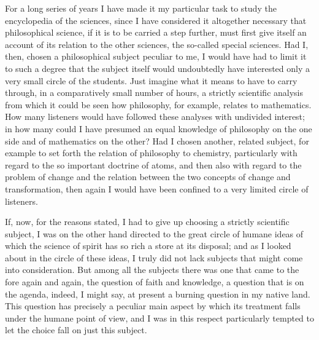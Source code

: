 \documentclass[12pt]{book}
\newcommand{\opage}[1]{\marginnote{\footnotesize\textit{[#1]}}}
\begin{document}
For a long series of years I have made it my particular task to study the
encyclopedia of the sciences, since I have considered it altogether
necessary that philosophical science, if it is to be carried a step
further, must first give itself an account of its relation to the other
sciences, the so-called special sciences. Had I, then, chosen a
philosophical subject peculiar to me, I would have had to limit it to
such a degree that the subject itself would undoubtedly have
\opage{281}\setcounter{footnote}{0}%
interested only a very small circle of the students. Just imagine what it
means to have to carry through, in a comparatively small number of hours,
a strictly scientific analysis from which it could be seen how philosophy,
for example, relates to mathematics. How many listeners would have
followed these analyses with undivided interest; in how many could I have
presumed an equal knowledge of philosophy on the one side and of
mathematics on the other? Had I chosen another, related subject, for
example to set forth the relation of philosophy to chemistry, particularly
with regard to the so important doctrine of atoms, and then also with
regard to the problem of change and the relation between the two concepts
of change and transformation, then again I would have been confined to a
very limited circle of listeners.

If, now, for the reasons stated, I had to give up choosing a strictly
scientific subject, I was on the other hand directed to the great circle
of humane ideas of which the science of spirit has so rich a store at its
disposal; and as I looked about in the circle of these ideas, I truly did
not lack subjects that might come into consideration. But among all the
subjects there was one that came to the fore again and again, the question
of faith and knowledge, a question that is on the agenda, indeed, I might
say, at present a burning question in my native land. This question has
precisely a peculiar main aspect by which its treatment falls under the
humane point of view, and I was in this respect particularly tempted to
let the choice fall on just this subject.
\end{document}
